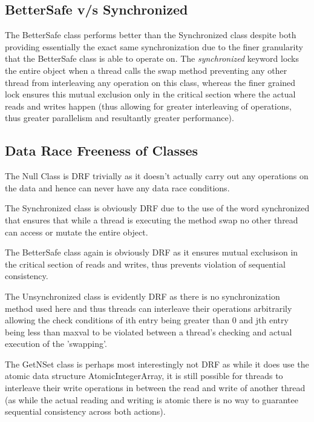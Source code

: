 \subsection{BetterSafe v/s Synchronized}
The BetterSafe class performs better than the Synchronized class despite both providing essentially the exact same synchronization due to the finer granularity that the BetterSafe class is able to operate on. The \emph{synchronized} keyword locks the entire object when a thread calls the swap method preventing any other thread from interleaving any operation on this class, whereas the finer grained lock ensures this mutual exclusion only in the critical section where the actual reads and writes happen (thus allowing for greater interleaving of operations, thus greater parallelism and resultantly greater performance). 

\subsection{Data Race Freeness of Classes}
The Null Class is DRF trivially as it doesn't actually carry out any operations on the data and hence can never have any data race conditions. 

The Synchronized class is obviously DRF due to the use of the word synchronized that ensures that while a thread is executing the method swap no other thread can access or mutate the entire object. 

The BetterSafe class again is obviously DRF as it ensures mutual exclusison in the critical section of reads and writes, thus prevents violation of sequential consistency. 

The Unsynchronized class is evidently DRF as there is no synchronization method used here and thus threads can interleave their operations arbitrarily allowing the check conditions of ith entry being greater than 0 and jth entry being less than maxval to be violated between a thread's checking and actual execution of the 'swapping'. 

The GetNSet class is perhaps most interestingly not DRF as while it does use the atomic data structure AtomicIntegerArray, it is still possible for threads to interleave their write operations in between the read and write of another thread (as while the actual reading and writing is atomic there is no way to guarantee sequential consistency across both actions). 



